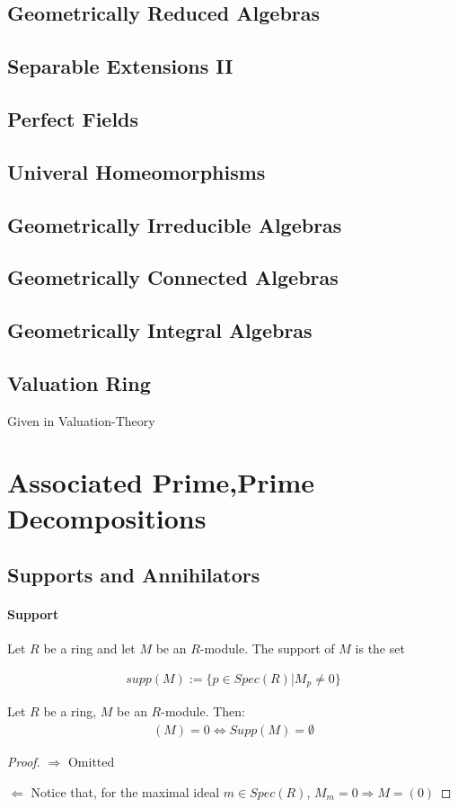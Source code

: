 \documentclass[Total.tex]{subfiles}
\begin{document}
		\section{Geometrically Reduced Algebras}
		\section{Separable Extensions II}
		\section{Perfect Fields}
		\section{Univeral Homeomorphisms}
		\section{Geometrically Irreducible Algebras}
		\section{Geometrically Connected Algebras}
		\section{Geometrically Integral Algebras}
		\section{Valuation Ring}
			Given in Valuation-Theory
	\chapter{Associated Prime,Prime Decompositions}
		\section{Supports and Annihilators}
			\subsubsection{Support}
			\begin{Def}
				Let $R$ be a ring and let $M$ be an $R$-module. The support of $M$ is the set
				
				\begin{gather*}
					supp(M):=\{p\in Spec(R)|M_p\not=0\}
				\end{gather*}
			\end{Def}
			\begin{lemma}
				Let $R$ be a ring, $M$ be an $R$-module. Then:
				\begin{gather*}
					(M)=0\Leftrightarrow Supp(M)=\emptyset
				\end{gather*}
			\end{lemma}
			\begin{proof}
				$\Rightarrow$ Omitted
				
				$\Leftarrow$ Notice that, for the maximal ideal $m\in Spec(R)$, $M_m=0\Rightarrow M=(0)$
			\end{proof}
\end{document}
